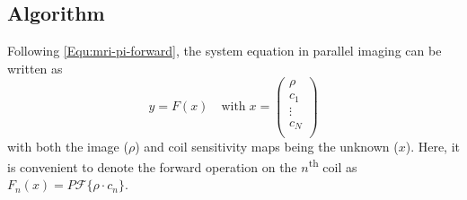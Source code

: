 \subsection*{Algorithm}
Following \cref{Equ:mri-pi-forward}, the system equation in parallel imaging can be written as
\begin{equation} \label{Equ:rtmri-nlinv-system}
  y = F(x) \quad \text{with} \; x = 
  \left( \begin{array} {c}
    \rho \\
    c_1 \\
    \vdots \\
    c_N \\
  \end{array} \right)
\end{equation}
with both the image ($\rho$) and coil sensitivity maps being the unknown ($x$). Here, it is convenient to denote the forward operation on the $n$\textsuperscript{th} coil as $F_n (x) = P \mathcal{F} \{ \rho \cdot c_n \}$.

